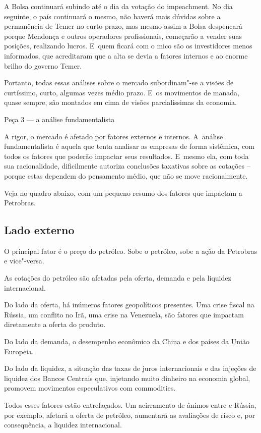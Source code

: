 A Bolsa continuará subindo até o dia da votação do impeachment. No dia
seguinte, o país continuará o mesmo, não haverá mais dúvidas sobre a
permanência de Temer no curto prazo, mas mesmo assim a Bolsa despencará
porque Mendonça e outros operadores profissionais, começarão a vender
suas posições, realizando lucros. E~quem ficará com o mico são os
investidores menos informados, que acreditaram que a alta se devia a
fatores internos e ao enorme brilho do governo Temer.

Portanto, todas essas análises sobre o mercado subordinam"-se a visões de
curtíssimo, curto, algumas vezes médio prazo. E~os movimentos de manada,
quase sempre, são montados em cima de visões parcialíssimas da economia.

Peça 3 --- a análise fundamentalista

A rigor, o mercado é afetado por fatores externos e internos. A~análise
fundamentalista é aquela que tenta analisar as empresas de forma
sistêmica, com todos os fatores que poderão impactar seus resultados. E~mesmo ela, com toda sua racionalidade, dificilmente autoriza conclusões
taxativas sobre as cotações -- porque estas dependem do pensamento
médio, que não se move racionalmente.

Veja no quadro abaixo, com um pequeno resumo dos fatores que impactam a
Petrobras.

 

\subsection{Lado externo}

O principal fator é o preço do petróleo. Sobe o petróleo, sobe a ação da
Petrobras e vice"-versa.

As cotações do petróleo são afetadas pela oferta, demanda e pela
liquidez internacional.

Do lado da oferta, há inúmeros fatores geopolíticos presentes. Uma crise
fiscal na Rússia, um conflito no Irã, uma crise na Venezuela, são
fatores que impactam diretamente a oferta do produto.

Do lado da demanda, o desempenho econômico da China e dos países da
União Europeia.

Do lado da liquidez, a situação das taxas de juros internacionais e das
injeções de liquidez dos Bancos Centrais que, injetando muito dinheiro
na economia global, promovem movimentos especulativos com commodities.

Todos esses fatores estão entrelaçados. Um acirramento de ânimos entre
 e Rússia, por exemplo, afetará a oferta de petróleo, aumentará as
avaliações de risco e, por consequência, a liquidez internacional.

